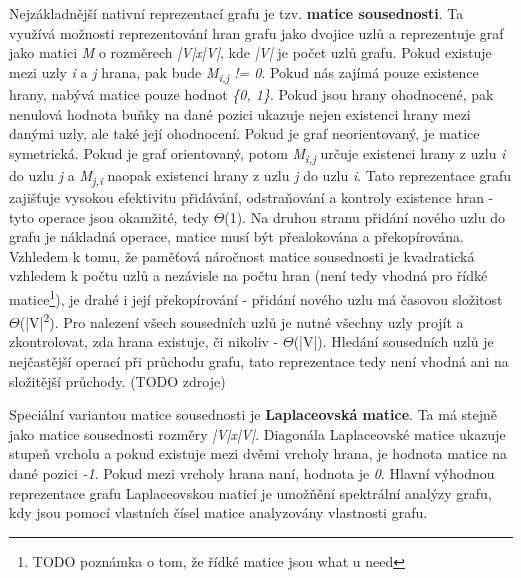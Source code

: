 Nejzákladnější nativní reprezentací grafu je tzv. \textbf{matice sousednosti}. Ta využívá možnosti reprezentování hran grafu jako dvojice uzlů a reprezentuje graf jako matici \textit{M} o rozměrech \textit{|V|x|V|}, kde \textit{|V|} je počet uzlů grafu. Pokud existuje mezi uzly \textit{i} a \textit{j} hrana, pak bude \textit{M\textsubscript{i,j} != 0}. 
Pokud nás zajímá pouze existence hrany, nabývá matice pouze hodnot \textit{\{0, 1\}}. Pokud jsou hrany ohodnocené, pak nenulová hodnota buňky na dané pozici ukazuje nejen existenci hrany mezi danými uzly, ale také její ohodnocení. Pokud je graf neorientovaný, je matice symetrická. Pokud je graf orientovaný, potom \textit{M\textsubscript{i,j}} určuje existenci hrany z uzlu \textit{i} do uzlu \textit{j} a \textit{M\textsubscript{j,i}} naopak existenci hrany z uzlu \textit{j} do uzlu \textit{i}. 
Tato reprezentace grafu zajišťuje vysokou efektivitu přidávání, odstraňování a kontroly existence hran - tyto operace jsou okamžité, tedy $\Theta$(1).  Na druhou stranu přidání nového uzlu do grafu je nákladná operace, matice musí být přealokována a překopírována. Vzhledem k tomu, že paměťová náročnost matice sousednosti je kvadratická vzhledem k počtu uzlů a nezávisle na počtu hran (není tedy vhodná pro řídké matice\footnote{TODO poznámka o tom, že řídké matice jsou what u need}), je drahé i její překopírování - přidání nového uzlu má časovou složitost $\Theta$(|V|\textsuperscript{2}). 
Pro nalezení všech sousedních uzlů je nutné všechny uzly projít a zkontrolovat, zda hrana existuje, či nikoliv - $\Theta$(|V|). Hledání sousedních uzlů je nejčastější operací při průchodu grafu, tato reprezentace tedy není vhodná ani na složitější průchody. (TODO zdroje)

Speciální variantou matice sousednosti je \textbf{Laplaceovská matice}. Ta má stejně jako matice sousednosti rozměry \textit{|V|x|V|}. Diagonála Laplaceovské matice ukazuje stupeň vrcholu a pokud existuje mezi dvěmi vrcholy hrana, je hodnota matice na dané pozici \textit{-1}. Pokud mezi vrcholy hrana naní, hodnota je \textit{0}. Hlavní výhodnou reprezentace grafu Laplaceovskou maticí je umožňění spektrální analýzy grafu\cite{Bernard93}, kdy jsou pomocí vlastních čísel matice analyzovány vlastnosti grafu.

